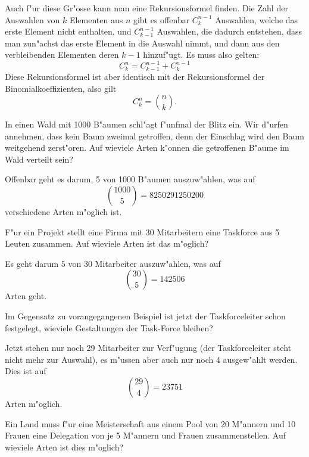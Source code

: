 Auch f"ur diese Gr"osse kann man eine Rekursionsformel finden.
Die Zahl der Auswahlen von $k$ Elementen aus $n$ gibt es
offenbar $C^{n-1}_{k}$ Auswahlen, welche das erste Element nicht
enthalten, und $C^{n-1}_{k-1}$ Auswahlen, die dadurch entstehen,
dass man zun"achst das erste Element in die Auswahl nimmt, und dann
aus den verbleibenden Elementen deren $k-1$ hinzuf"ugt.
Es muss also
gelten:
\[
C^n_k=C^{n-1}_{k-1}+C^{n-1}_{k}
\]
Diese Rekursionsformel ist aber identisch mit der Rekursionsformel
der Binomialkoeffizienten, also gilt
\[
C^n_k=\binom{n}{k}.
\]

\begin{beispiele}
\item In einen Wald mit 1000 B"aumen schl"agt f"unfmal der Blitz ein.
Wir d"urfen annehmen, dass kein Baum zweimal getroffen, denn der
Einschlag wird den Baum weitgehend zerst"oren.
Auf wieviele Arten
k"onnen die getroffenen B"aume im Wald verteilt sein?

\begin{loesung}
Offenbar geht es darum, 5 von 1000 B"aumen auszuw"ahlen, was 
auf
\[
\binom{1000}{5}=8250291250200
\]
verschiedene Arten m"oglich ist.
\end{loesung}

\item F"ur ein Projekt stellt eine Firma mit 30 Mitarbeitern eine Taskforce
aus 5 Leuten zusammen.
Auf wieviele Arten ist das m"oglich?


\begin{loesung}
Es geht darum $5$ von $30$ Mitarbeiter auszuw"ahlen, was auf
\[
\binom{30}{5}=142506
\]
Arten geht.
\end{loesung}

\item Im Gegensatz zu vorangegangenen Beispiel ist jetzt der
Taskforceleiter schon festgelegt, wieviele Gestaltungen der
Task-Force bleiben?

\begin{loesung}
Jetzt stehen nur noch 29 Mitarbeiter zur Verf"ugung (der Taskforceleiter
steht nicht mehr zur Auswahl), es m"ussen aber auch nur noch 4 ausgew"ahlt
werden.
Dies ist auf
\[
\binom{29}{4}=23751
\]
Arten m"oglich.
\end{loesung}

\item\label{meisterschaft}
Ein Land muss f"ur eine Meisterschaft aus einem Pool von
20 M"annern und 10 Frauen eine Delegation von je 5 M"annern
und Frauen zusammenstellen.
Auf wieviele Arten ist dies m"oglich?


\end{beispiele}
